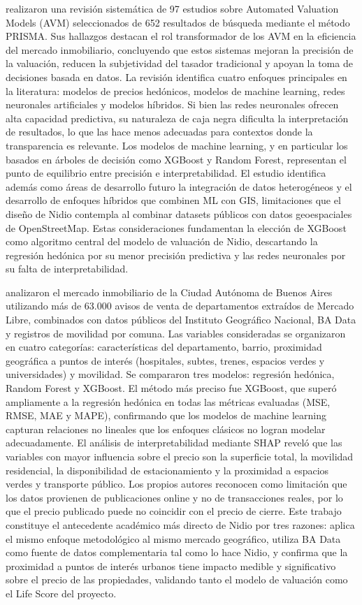 \textcite{ElJaouhariEtAl2024} realizaron una revisión sistemática de 97 estudios sobre Automated Valuation Models (AVM) seleccionados de 652 resultados de búsqueda mediante el método PRISMA. Sus hallazgos destacan el rol transformador de los AVM en la eficiencia del mercado inmobiliario, concluyendo que estos sistemas mejoran la precisión de la valuación, reducen la subjetividad del tasador tradicional y apoyan la toma de decisiones basada en datos. La revisión identifica cuatro enfoques principales en la literatura: modelos de precios hedónicos, modelos de machine learning, redes neuronales artificiales y modelos híbridos. Si bien las redes neuronales ofrecen alta capacidad predictiva, su naturaleza de caja negra dificulta la interpretación de resultados, lo que las hace menos adecuadas para contextos donde la transparencia es relevante. Los modelos de machine learning, y en particular los basados en árboles de decisión como XGBoost y Random Forest, representan el punto de equilibrio entre precisión e interpretabilidad. El estudio identifica además como áreas de desarrollo futuro la integración de datos heterogéneos y el desarrollo de enfoques híbridos que combinen ML con GIS, limitaciones que el diseño de Nidio contempla al combinar datasets públicos con datos geoespaciales de OpenStreetMap. Estas consideraciones fundamentan la elección de XGBoost como algoritmo central del modelo de valuación de Nidio, descartando la regresión hedónica por su menor precisión predictiva y las redes neuronales por su falta de interpretabilidad.

\textcite{GutierrezEtAl2025} analizaron el mercado inmobiliario de la Ciudad Autónoma de Buenos Aires utilizando más de 63.000 avisos de venta de departamentos extraídos de Mercado Libre, combinados con datos públicos del Instituto Geográfico Nacional, BA Data y registros de movilidad por comuna. Las variables consideradas se organizaron en cuatro categorías: características del departamento, barrio, proximidad geográfica a puntos de interés (hospitales, subtes, trenes, espacios verdes y universidades) y movilidad. Se compararon tres modelos: regresión hedónica, Random Forest y XGBoost. El método más preciso fue XGBoost, que superó ampliamente a la regresión hedónica en todas las métricas evaluadas (MSE, RMSE, MAE y MAPE), confirmando que los modelos de machine learning capturan relaciones no lineales que los enfoques clásicos no logran modelar adecuadamente. El análisis de interpretabilidad mediante SHAP reveló que las variables con mayor influencia sobre el precio son la superficie total, la movilidad residencial, la disponibilidad de estacionamiento y la proximidad a espacios verdes y transporte público. Los propios autores reconocen como limitación que los datos provienen de publicaciones online y no de transacciones reales, por lo que el precio publicado puede no coincidir con el precio de cierre. Este trabajo constituye el antecedente académico más directo de Nidio por tres razones: aplica el mismo enfoque metodológico al mismo mercado geográfico, utiliza BA Data como fuente de datos complementaria tal como lo hace Nidio, y confirma que la proximidad a puntos de interés urbanos tiene impacto medible y significativo sobre el precio de las propiedades, validando tanto el modelo de valuación como el Life Score del proyecto.

